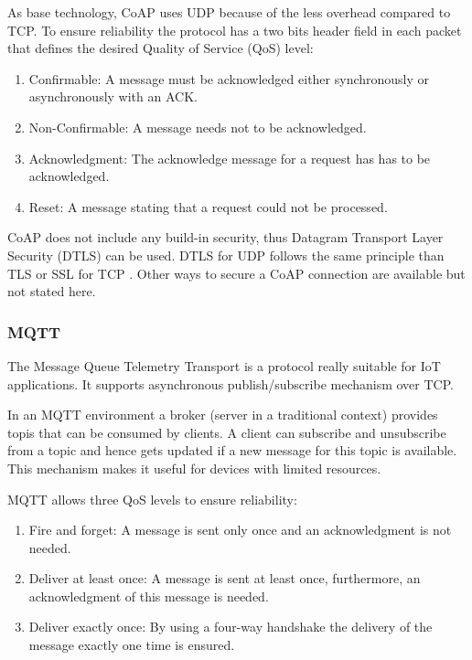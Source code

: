 As base technology, CoAP uses UDP because of the less overhead compared to TCP. To ensure reliability the protocol has a two bits header field in each packet that defines the desired Quality of Service (QoS) level:

\begin{enumerate}
	\item Confirmable: A message must be acknowledged either synchronously or asynchronously with an ACK.
	\item Non-Confirmable: A message needs not to be acknowledged.
	\item Acknowledgment: The acknowledge message for a request has has to be acknowledged.
	\item Reset: A message stating that a request could not be processed.
\end{enumerate}

CoAP does not include any build-in security, thus Datagram Transport Layer Security (DTLS) can be used. DTLS for UDP follows the same principle than TLS or SSL for TCP . Other ways to secure a CoAP connection are available but not stated here.

\subsubsection{MQTT}
The Message Queue Telemetry Transport is a protocol really suitable for IoT applications. It supports asynchronous publish/subscribe mechanism over TCP.

In an MQTT environment a broker (server in a traditional context) provides topis that can be consumed by clients. A client can subscribe and unsubscribe from a topic and hence gets updated if a new message for this topic is available. This mechanism makes it useful for devices with limited resources.

MQTT allows three QoS levels to ensure reliability:

\begin{enumerate}
	\item Fire and forget: A message is sent only once and an acknowledgment is not needed.
	\item Deliver at least once: A message is sent at least once, furthermore, an acknowledgment of this message is needed.
	\item Deliver exactly once: By using a four-way handshake the delivery of the message exactly one time is ensured.
\end{enumerate}


